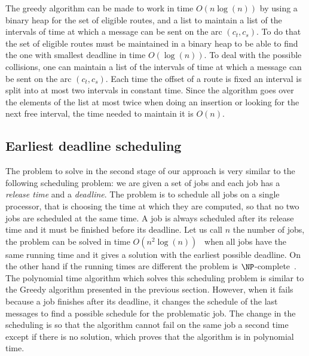 \documentclass[10pt, conference, letterpaper]{IEEEtran}
\begin{document}
    The greedy algorithm can be made to work in time $O(n\log(n))$ by using a binary heap for the set of eligible routes, and a list to maintain a list of the intervals
    of time at which a message can be sent on the arc $(c_t,c_s)$.
    To do that the set of eligible routes must be maintained in a binary heap
    to be able to find the one with smallest deadline in time $O(\log(n))$. 
    To deal with the possible collisions, one can maintain a list of the intervals
    of time at which a message can be sent on the arc $(c_t,c_s)$. Each time the offset of a 
    route is fixed an interval is split into at most two intervals in constant time. 
    Since the algorithm goes over the elements of the list at most twice when doing an insertion
    or looking for the next free interval, the time needed to maintain it is $O(n)$. 
%    
%     
    

    
     
     \subsection{Earliest deadline scheduling}
     
     
     The problem to solve in the second stage of our approach is very similar to the following scheduling problem: 
     we are given a set of jobs and each job has a \emph{release time} and a \emph{deadline}. 
     The problem is to schedule all jobs on a single processor, that is choosing the time at which they are computed, so that no two jobs are scheduled at the same time. A job is always scheduled after its release time and it must be finished before its deadline. Let us call $n$ the number of jobs, the problem can be solved in time $O(n^2\log(n))$~\cite{simons1978fast} when all jobs have the same running time and it gives a solution with the earliest possible deadline. On the other hand if the running times are different the problem is $\NP$-complete~\cite{lenstra1977complexity}. 
     The  polynomial time algorithm  which solves this scheduling problem is similar to the Greedy algorithm presented in the previous section. However, when it fails because a job finishes after its deadline, it changes the schedule of the last messages to find a possible schedule for the problematic job. The change in the scheduling is so that the algorithm cannot fail on the same job a second time except if there is no solution, which proves that the algorithm is in polynomial time.
     
\end{document}
